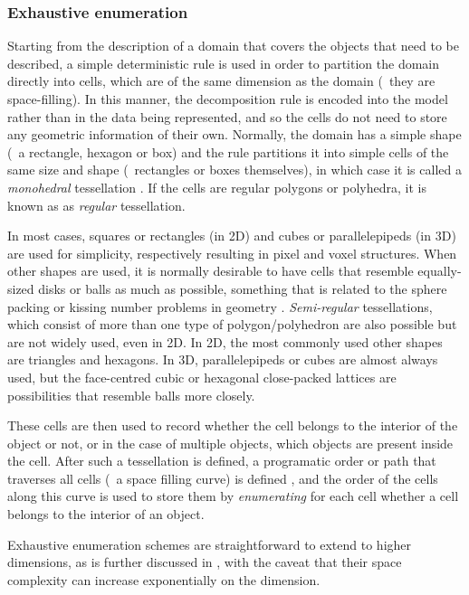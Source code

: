 \subsubsection{Exhaustive enumeration}

Starting from the description of a domain that covers the objects that need to be described, a simple deterministic rule is used in order to partition the domain directly into cells, which are of the same dimension as the domain (\ie\ they are space-filling).
In this manner, the decomposition rule is encoded into the model rather than in the data being represented, and so the cells do not need to store any geometric information of their own.
Normally, the domain has a simple shape (\eg\ a rectangle, hexagon or box) \citep[\S{}6.8]{ISO19123:2007} and the rule partitions it into simple cells of the same size and shape (\eg\ rectangles or boxes themselves), in which case it is called a \emph{monohedral} tessellation \citep{Boots99}.
If the cells are regular polygons or polyhedra, it is known as as \emph{regular} tessellation.

In most cases, squares or rectangles (in 2D) and cubes or parallelepipeds (in 3D) are used for simplicity, respectively resulting in pixel and voxel structures.
When other shapes are used, it is normally desirable to have cells that resemble equally-sized disks or balls as much as possible, something that is related to the sphere packing or kissing number problems in geometry \citep{Conway92}.
\emph{Semi-regular} tessellations, which consist of more than one type of polygon/polyhedron are also possible but are not widely used, even in 2D.
In 2D, the most commonly used other shapes are triangles and hexagons.
In 3D, parallelepipeds or cubes are almost always used, but the face-centred cubic or hexagonal close-packed lattices are possibilities that resemble balls more closely.

These cells are then used to record whether the cell belongs to the interior of the object or not, or in the case of multiple objects, which objects are present inside the cell.
After such a tessellation is defined, a programatic order or path that traverses all cells (\ie\ a space filling curve) is defined \citep{Sagan94}, and the order of the cells along this curve is used to store them by \emph{enumerating} for each cell whether a cell belongs to the interior of an object.

Exhaustive enumeration schemes are straightforward to extend to higher dimensions, as is further discussed in , with the caveat that their space complexity can increase exponentially on the dimension.

